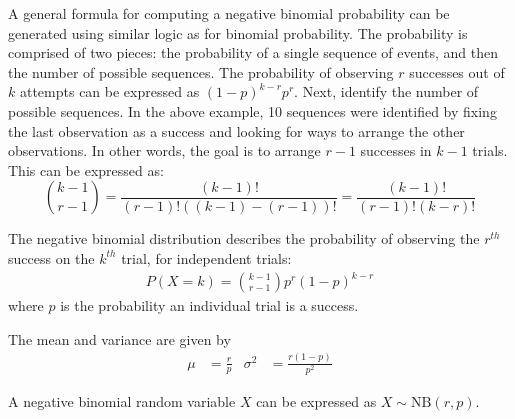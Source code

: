 A general formula for computing a negative binomial probability can be generated using similar logic as for binomial probability. The probability is comprised of two pieces: the probability of a single sequence of events, and then the number of possible sequences. The probability of observing $r$ successes out of $k$ attempts can be expressed as $(1-p)^{k-r} p^{r}$. Next, identify the number of possible sequences. In the above example, 10 sequences were identified by fixing the last observation as a success and looking for ways to arrange the other observations. In other words, the goal is to arrange $r-1$ successes in $k-1$ trials. This can be expressed as: \[{k-1 \choose r-1} = \frac{(k-1)!}{(r-1)! \left((k-1) - (r-1)\right)!} = \frac{(k-1)!}{(r-1)! \left(k - r\right)!}\]

\begin{termBox}{
		The negative binomial distribution describes the probability of observing the $r^{th}$ success on the $k^{th}$ trial, for independent trials:
		\begin{eqnarray}
		P(X = k) = {k-1 \choose r-1} p^{r}(1-p)^{k-r}
		\label{negativeBinomialEquation}
		\end{eqnarray}
		where $p$ is the probability an individual trial is a success.
		
		The mean and variance are given by\vspace{-2.5mm}
		\begin{align*}
		\mu &= \frac{r}{p}
		&\sigma^2&=\frac{r(1-p)}{p^2}
		\end{align*}
		
		A negative binomial random variable $X$ can be expressed as $X \sim \textrm{NB}(r, p)$.
		
		}
\end{termBox}


